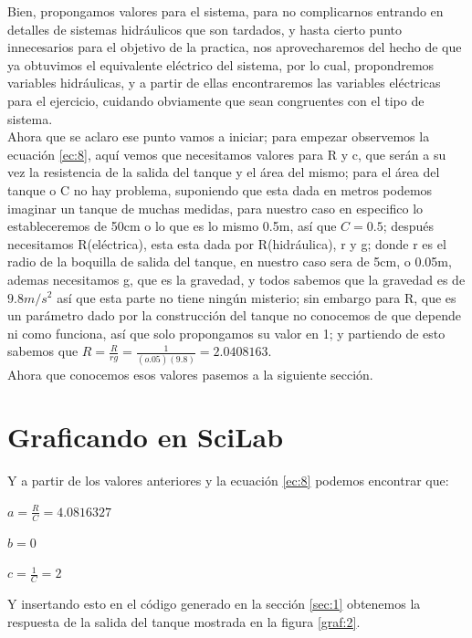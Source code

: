 \documentclass[letterpaper,spanish,12pt]{report}
\begin{document}
Bien, propongamos valores para el sistema, para no complicarnos entrando en detalles de sistemas hidr\'aulicos que son tardados, y hasta cierto punto innecesarios para el objetivo de la practica, nos aprovecharemos del hecho de que ya obtuvimos el equivalente el\'ectrico del sistema, por lo cual, propondremos variables hidr\'aulicas, y a partir de ellas encontraremos las variables el\'ectricas para el ejercicio, cuidando obviamente que sean congruentes con el tipo de sistema. \medskip \\Ahora que se aclaro ese punto vamos a iniciar; para empezar observemos la ecuaci\'on \ref{ec:8}, aqu\'i vemos que necesitamos valores para R y c, que ser\'an a su vez la resistencia de la salida del tanque y el \'area del mismo; para el \'area del tanque o C no hay problema, suponiendo que esta dada en metros podemos imaginar un tanque de muchas medidas, para nuestro caso en especifico lo estableceremos de 50cm o lo que es lo mismo 0.5m, as\'i que $C = 0.5$; despu\'es necesitamos R(el\'ectrica), esta esta dada por R(hidr\'aulica), r y g; donde r es el radio de la boquilla de salida del tanque, en nuestro caso sera de 5cm, o 0.05m, ademas necesitamos g, que es la gravedad, y todos sabemos que la gravedad es de $9.8m/s^{2}$ as\'i que esta parte no tiene ning\'un misterio; sin embargo para R, que es un par\'ametro dado por la construcci\'on del tanque no conocemos de que depende ni como funciona, as\'i que solo propongamos su valor en 1; y partiendo de esto sabemos que $R = \frac {R} {rg} = \frac {1} {(o.05)(9.8)} = 2.0408163$.\medskip \\ Ahora que conocemos esos valores pasemos a la siguiente secci\'on.
	
	\section{Graficando en SciLab}
	
Y a partir de los valores anteriores y la ecuaci\'on \ref{ec:8} podemos encontrar que:
	
	\begin{center}$a = \frac {R} {C} = 4.0816327$\end{center}
	\begin{center}$b = 0$\end{center}
	\begin{center}$c = \frac {1} {C} = 2$\end{center}
	
Y insertando esto en el c\'odigo generado en la secci\'on  \ref{sec:1} obtenemos la respuesta de la salida del tanque mostrada en la figura \ref{graf:2}.
\end{document}
